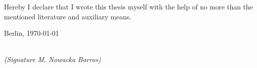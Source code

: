 \newpage

\thispagestyle{empty}

\begin{large}

\vspace*{6cm}

\noindent
Hereby I declare that I wrote this thesis myself with the help of no more than the mentioned literature and auxiliary means.
\vspace{2cm}

\noindent
Berlin, \today

\vspace{3cm}

\hspace*{7cm}%
\dotfill\\
\hspace*{8cm}%
\textit{(Signature M. Nowacka Barros)}

\end{large}
